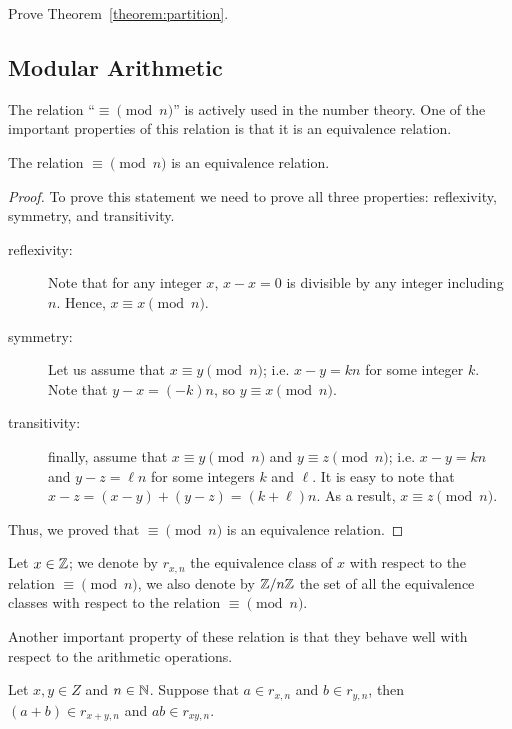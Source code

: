 \begin{exercise}
  Prove Theorem~\ref{theorem:partition}.
\end{exercise}

\subsection{Modular Arithmetic}
The relation ``$\equiv \pmod{n}$'' is actively used in the number theory. One
of the important properties of this relation is that it is an equivalence
relation.
\begin{theorem}
  The relation $\equiv \pmod{n}$ is an equivalence relation.
\end{theorem}
\begin{proof}
  To prove this statement we need to prove all three properties: reflexivity,
  symmetry, and transitivity.
  \begin{description}
    \item[reflexivity:] Note that for any integer $x$, $x - x = 0$ is divisible
      by any integer including $n$. Hence, $x \equiv x \pmod{n}$.
    \item[symmetry:] Let us assume that $x \equiv y \pmod{n}$; i.e. $x - y = kn$
      for some integer $k$. Note that $y - x = (-k) n$, so
      $y \equiv x \pmod{n}$.
    \item[transitivity:] finally, assume that $x \equiv y \pmod{n}$ and
      $y \equiv z \pmod{n}$; i.e. $x - y = k n$ and $y - z = \ell n$
      for some integers $k$ and $\ell$. It is easy to note that
      $x - z = (x - y) + (y - z) = (k + \ell) n$. As a result,
      $x \equiv z \pmod{n}$.
  \end{description}
  Thus, we proved that $\equiv \pmod{n}$ is an equivalence relation.
\end{proof}

Let $x \in \mathbb{Z}$; we denote by $r_{x, n}$ the equivalence class of $x$ with
respect to the relation $\equiv \pmod{n}$, we also denote by $\mathbb{Z} / n\mathbb{Z}$ the set
of all the equivalence classes with respect to the relation $\equiv \pmod{n}$.

Another important property of these relation is that they behave well with
respect to the arithmetic operations.
\begin{theorem}
  Let $x, y \in Z$ and $n \in \mathbb{N}$. Suppose that $a \in r_{x, n}$ and $b \in
  r_{y, n}$, then $(a + b) \in r_{x + y, n}$ and $ab \in r_{xy, n}$.
\end{theorem}

